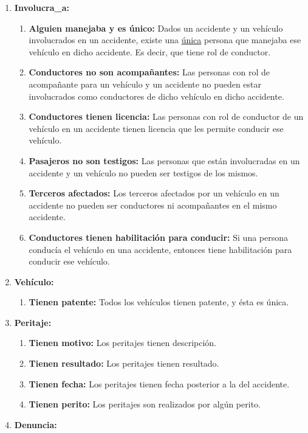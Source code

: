 \begin{enumerate}
  \item \textbf{Involucra_a:}
  \begin{enumerate}
    \item \textbf{Alguien manejaba y es único:} Dados un accidente y un vehículo involucrados en un accidente, existe una \underline{única} persona que manejaba ese vehículo en dicho accidente. Es decir, que tiene rol de conductor.
    \item \textbf{Conductores no son acompa\~nantes:} Las personas con rol de acompañante para un vehículo y un accidente no pueden estar involucrados como conductores de dicho vehículo en dicho accidente.
    \item \textbf{Conductores tienen licencia:} Las personas con rol de conductor de un vehículo en un accidente tienen licencia que les permite conducir ese vehículo.
    \item \textbf{Pasajeros no son testigos:} Las personas que están involucradas en un accidente y un vehículo no pueden ser testigos de los mismos.
    \item \textbf{Terceros afectados:} Los terceros afectados por un vehículo en un accidente no pueden ser conductores ni acompañantes en el mismo accidente.
    \item \textbf{Conductores tienen habilitación para conducir:} Si una persona conducía el vehículo en una accidente, entonces tiene habilitación para conducir ese vehículo.
  \end{enumerate}
  \item \textbf{Vehículo:}
    \begin{enumerate}
      \item \textbf{Tienen patente:} Todos los vehículos tienen patente, y ésta es única.
    \end{enumerate}
  \item \textbf{Peritaje:}
    \begin{enumerate}
      \item \textbf{Tienen motivo:} Los peritajes tienen descripción.
      \item \textbf{Tienen resultado:} Los peritajes tienen resultado.
      \item \textbf{Tienen fecha:} Los peritajes tienen fecha posterior a la del accidente.
      \item \textbf{Tienen perito:} Los peritajes son realizados por algún perito.
    \end{enumerate}
  \item \textbf{Denuncia:}

\end{enumerate}
